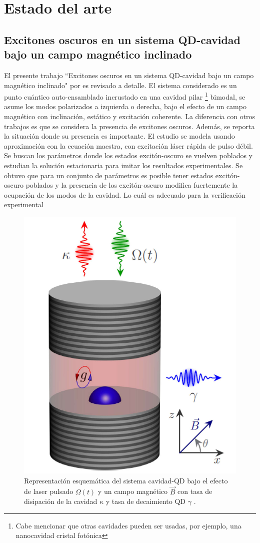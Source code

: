 \documentclass[../main.tex]{subfiles}
\begin{document}
\chapter{Estado del arte}
\section[Excitones oscuros en un sistema QD-cavidad bajo un campo magnético...]{Excitones oscuros en un sistema QD-cavidad bajo un campo magnético inclinado}
El presente trabajo ``Excitones oscuros en un sistema QD-cavidad bajo un campo magnético inclinado" por \parencite{Jimenez2017} es revisado a detalle. El sistema considerado es un punto cuántico auto-ensamblado incrustado en una cavidad pilar \parencite{Kim2011}\footnote{Cabe mencionar que otras cavidades pueden ser usadas, por ejemplo, una nanocavidad cristal fotónica} bimodal,  se asume los modos polarizados a izquierda o derecha, bajo el efecto de un campo magnético con inclinación, estático y excitación coherente. La diferencia con otros trabajos \parencite{Zhang2014} es que se considera la presencia de excitones oscuros. Además, se reporta la situación donde su presencia es importante. El estudio se modela usando aproximación con la ecuación maestra, con excitación láser rápida de pulso débil. Se buscan los parámetros donde los estados excitón-oscuro se vuelven poblados y estudian la solución estacionaria para imitar los resultados experimentales. Se obtuvo que para un conjunto de parámetros es posible tener estados excitón-oscuro poblados y la presencia de los excitón-oscuro modifica fuertemente la ocupación de los modos de la cavidad. Lo cuál es adecuado para la verificación experimental

\begin{figure}[th]
	\centering
	\includegraphics[width=0.35\linewidth]{img/cavidad-QD}
	\caption{Representación esquemática del sistema cavidad-QD bajo el efecto de laser pulsado $\Omega(t)$ y un campo magnético $\vec{B}$ con tasa de disipación de la cavidad $\kappa$ y tasa de decaimiento QD $\gamma$ \parencite{Jimenez2017}.}
	\label{fig:cavidad-qd}
\end{figure}
\end{document}
